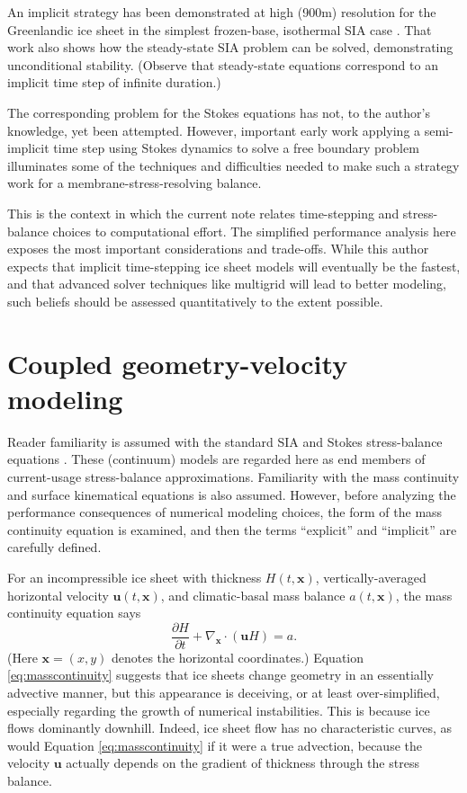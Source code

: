\documentclass[review]{igs}
\newcommand\bu{\mathbf{u}}
\newcommand\bx{\mathbf{x}}
\newcommand{\Divx}{\nabla_\bx \cdot}
\begin{document}
An implicit strategy has been demonstrated at high (900m) resolution for the Greenlandic ice sheet in the simplest frozen-base, isothermal SIA case \citep{Bueler2016}.  That work also shows how the steady-state SIA problem \citep[c.f.][]{JouvetBueler2012} can be solved, demonstrating unconditional stability.  (Observe that steady-state equations correspond to an implicit time step of infinite duration.)

The corresponding problem for the Stokes equations has not, to the author's knowledge, yet been attempted.  However, important early work applying a semi-implicit time step using Stokes dynamics \citep{WirbelJarosch2020} to solve a free boundary problem illuminates some of the techniques and difficulties needed to make such a strategy work for a membrane-stress-resolving balance.

This is the context in which the current note relates time-stepping and stress-balance choices to computational effort.  The simplified performance analysis here exposes the most important considerations and trade-offs.  While this author expects that implicit time-stepping ice sheet models will eventually be the fastest, and that advanced solver techniques like multigrid \citep{Briggsetal2000} will lead to better modeling, such beliefs should be assessed quantitatively to the extent possible.


\section{Coupled geometry-velocity modeling}

Reader familiarity is assumed with the standard SIA and Stokes stress-balance equations \citep{GreveBlatter2009,SchoofHewitt2013}.  These (continuum) models are regarded here as end members of current-usage stress-balance approximations.  Familiarity with the mass continuity and surface kinematical equations \citep{GreveBlatter2009} is also assumed.  However, before analyzing the performance consequences of numerical modeling choices, the form of the mass continuity equation is examined, and then the terms ``explicit'' and ``implicit'' are carefully defined.

For an incompressible ice sheet with thickness $H(t,\bx)$, vertically-averaged horizontal velocity $\bu(t,\bx)$, and climatic-basal mass balance $a(t,\bx)$, the mass continuity equation says
\begin{equation}
\frac{\partial H}{\partial t} + \Divx \left(\bu H\right) = a. \label{eq:masscontinuity}
\end{equation}
(Here $\bx=(x,y)$ denotes the horizontal coordinates.)  Equation \eqref{eq:masscontinuity} suggests that ice sheets change geometry in an essentially advective manner, but this appearance is deceiving, or at least over-simplified, especially regarding the growth of numerical instabilities.  This is because ice flows dominantly downhill.  Indeed, ice sheet flow has no characteristic curves, as would Equation \eqref{eq:masscontinuity} if it were a true advection, because the velocity $\bu$ actually depends on the gradient of thickness through the stress balance.
\end{document}
